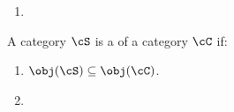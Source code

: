     \begin{example}
        \phantom{a}
        \begin{enumerate}[label = (\arabic*)]
            \item 
        \end{enumerate}
    \end{example}

    \begin{definition}
        A category $\cS$ is a  of a category $\cC$ if:
            \begin{enumerate}[label = (\arabic*)]
                \item $\obj(\cS) \subseteq \obj(\cC)$.
                \item 
            \end{enumerate}
    \end{definition}